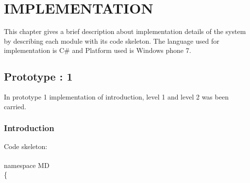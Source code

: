 \chapter{IMPLEMENTATION}

This chapter gives a brief description about implementation details of the
system by describing each module with its code skeleton. The language used for implementation is C\# and Platform used is Windows phone 7.

\section{Prototype : 1}
\hspace{1cm}In prototype 1 implementation of introduction,  level 1 and level 2 was been carried.
\subsection{Introduction}
\ttfamily \hspace{1cm}
Code skeleton:\\
\\

namespace MD\\
\{\\
    
